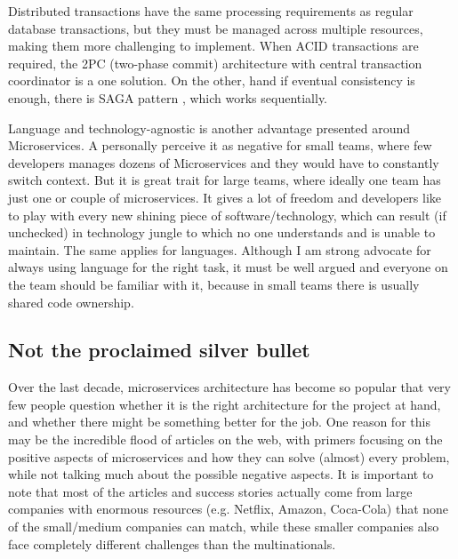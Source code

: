 
Distributed transactions have the same processing requirements as regular database transactions, but they must be managed across multiple resources, making them more challenging to implement. When ACID transactions are required, the 2PC \cite{2PC_PATTERN} (two-phase commit) architecture with central transaction coordinator is a one solution. On the other, hand if eventual consistency is enough, there is SAGA pattern \cite{SAGA_PATTERN}, which works sequentially.

Language and technology-agnostic is another advantage presented around Microservices. A personally perceive it as negative for small teams, where few developers manages dozens of Microservices and they would have to constantly switch context. But it is great trait for large teams, where ideally one team has just one or couple of microservices. It gives a lot of freedom and developers like to play with every new shining piece of software/technology, which can result (if unchecked) in technology jungle to which no one understands and is unable to maintain. The same applies for languages. Although I am strong advocate for always using language for the right task, it must be well argued and everyone on the team should be familiar with it, because in small teams there is usually shared code ownership.


\subsection{Not the proclaimed silver bullet}
Over the last decade, microservices architecture has become so popular that very few people question whether it is the right architecture for the project at hand, and whether there might be something better for the job. One reason for this may be the incredible flood of articles on the web, with primers focusing on the positive aspects of microservices and how they can solve (almost) every problem, while not talking much about the possible negative aspects. It is important to note that most of the articles and success stories actually come from large companies with enormous resources (e.g. Netflix, Amazon, Coca-Cola) that none of the small/medium companies can match, while these smaller companies also face completely different challenges than the multinationals.

